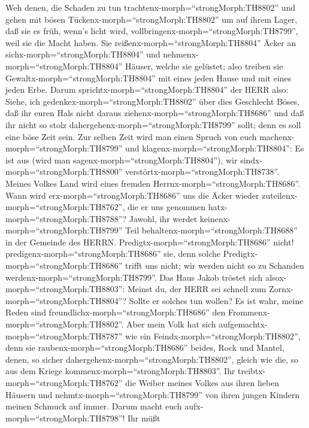  Weh denen, die Schaden zu tun
trachtenx-morph=``strongMorph:TH8802'' und gehen mit bösen
Tückenx-morph=``strongMorph:TH8802'' um auf ihrem Lager, daß sie es
früh, wenn's licht wird, vollbringenx-morph=``strongMorph:TH8799'', weil
sie die Macht haben.  Sie
reißenx-morph=``strongMorph:TH8804'' Äcker an
sichx-morph=``strongMorph:TH8804'' und
nehmenx-morph=``strongMorph:TH8804'' Häuser, welche sie gelüstet; also
treiben sie Gewaltx-morph=``strongMorph:TH8804'' mit eines jeden Hause
und mit eines jeden Erbe.  Darum
sprichtx-morph=``strongMorph:TH8804'' der HERR also: Siehe, ich
gedenkex-morph=``strongMorph:TH8802'' über dies Geschlecht Böses, daß
ihr euren Hals nicht daraus ziehenx-morph=``strongMorph:TH8686'' und daß
ihr nicht so stolz dahergehenx-morph=``strongMorph:TH8799'' sollt; denn
es soll eine böse Zeit sein.  Zur selben Zeit wird man einen
Spruch von euch machenx-morph=``strongMorph:TH8799'' und
klagenx-morph=``strongMorph:TH8804'': Es ist aus (wird man
sagenx-morph=``strongMorph:TH8804''), wir
sindx-morph=``strongMorph:TH8800''
verstörtx-morph=``strongMorph:TH8738''. Meines Volkes Land wird eines
fremden Herrnx-morph=``strongMorph:TH8686''. Wann wird
erx-morph=``strongMorph:TH8686'' uns die Äcker wieder
zuteilenx-morph=``strongMorph:TH8762'', die er uns genommen
hatx-morph=``strongMorph:TH8788''?  Jawohl, ihr werdet
keinenx-morph=``strongMorph:TH8799'' Teil
behaltenx-morph=``strongMorph:TH8688'' in der Gemeinde des HERRN.
 Predigtx-morph=``strongMorph:TH8686'' nicht!
predigenx-morph=``strongMorph:TH8686'' sie, denn solche
Predigtx-morph=``strongMorph:TH8686'' trifft uns nicht; wir werden nicht
so zu Schanden werdenx-morph=``strongMorph:TH8799''.  Das
Haus Jakob tröstet sich alsox-morph=``strongMorph:TH8803'': Meinst du,
der HERR sei schnell zum Zornx-morph=``strongMorph:TH8804''? Sollte er
solches tun wollen? Es ist wahr, meine Reden sind
freundlichx-morph=``strongMorph:TH8686'' den
Frommenx-morph=``strongMorph:TH8802''.  Aber mein Volk hat
sich aufgemachtx-morph=``strongMorph:TH8787'' wie ein
Feindx-morph=``strongMorph:TH8802'', denn sie
raubenx-morph=``strongMorph:TH8686'' beides, Rock und Mantel, denen, so
sicher dahergehenx-morph=``strongMorph:TH8802'', gleich wie die, so aus
dem Kriege kommenx-morph=``strongMorph:TH8803''.  Ihr
treibtx-morph=``strongMorph:TH8762'' die Weiber meines Volkes aus ihren
lieben Häusern und nehmtx-morph=``strongMorph:TH8799'' von ihren jungen
Kindern meinen Schmuck auf immer.  Darum macht euch
aufx-morph=``strongMorph:TH8798''! Ihr müßt
